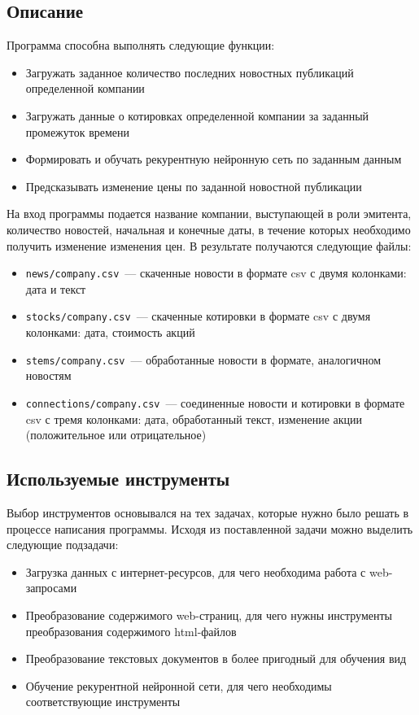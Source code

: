 \documentclass[14pt]{matmex-diploma-custom}
\begin{document}
\subsection{Описание}

Программа способна выполнять следующие функции:

\begin{itemize}
\item Загружать заданное количество последних новостных публикаций определенной компании
\item Загружать данные о котировках определенной компании за заданный промежуток времени
\item Формировать и обучать рекурентную нейронную сеть по заданным данным
\item Предсказывать изменение цены по заданной новостной публикации
\end{itemize}

На вход программы подается название компании, выступающей в роли эмитента, количество новостей, начальная и конечные даты, в течение которых необходимо получить изменение изменения цен. В результате получаются следующие файлы:

\begin{itemize}
\item \texttt{news/company.csv}~--- скаченные новости в формате csv с двумя колонками: дата и текст
\item \texttt{stocks/company.csv}~--- скаченные котировки в формате csv с двумя колонками: дата, стоимость акций
\item \texttt{stems/company.csv}~--- обработанные новости в формате, аналогичном новостям
\item \texttt{connections/company.csv}~--- соединенные новости и котировки в формате csv с тремя колонками: дата, обработанный текст, изменение акции (положительное или отрицательное)
\end{itemize}

\subsection{Используемые инструменты}

Выбор инструментов основывался на тех задачах, которые нужно было решать в процессе написания программы. Исходя из поставленной задачи можно выделить следующие подзадачи:

\begin{itemize}
\item Загрузка данных с интернет-ресурсов, для чего необходима работа с web-запросами
\item Преобразование содержимого web-страниц, для чего нужны инструменты преобразования содержимого html-файлов
\item Преобразование текстовых документов в более пригодный для обучения вид
\item Обучение рекурентной нейронной сети, для чего необходимы соответствующие инструменты
\end{itemize}
\end{document}
